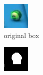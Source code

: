 \begin{figure}[h!]
    \centering
    \begin{subfigure}[b]{0.25\textwidth}
        \centering
        \includegraphics[width=\textwidth]{imgs/ball_localization/bbox_before.jpg}
        \caption{original box}
    \end{subfigure}
    \hspace{0.05\textwidth}
    \begin{subfigure}[b]{0.25\textwidth}
        \centering
        \includegraphics[width=\textwidth]{imgs/ball_localization/grabcut.jpg}

\end{subfigure}
\end{figure}
